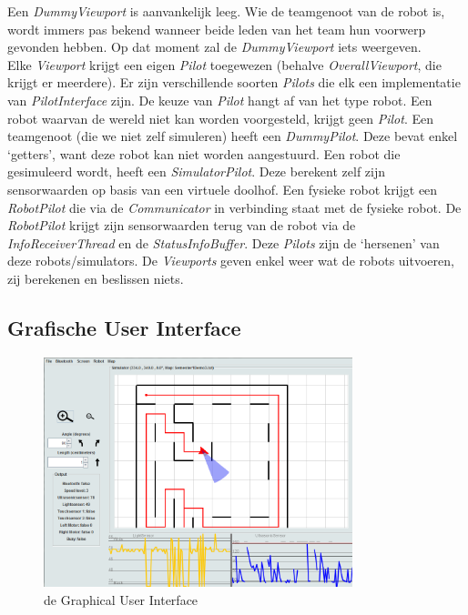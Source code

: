 \documentclass[tt2]{penoverslag}
\begin{document}
Een \textit{DummyViewport} is aanvankelijk leeg. Wie de teamgenoot van de robot is, wordt immers pas bekend wanneer beide leden van het team hun voorwerp gevonden hebben. Op dat moment zal de \textit{DummyViewport} iets weergeven.\\

Elke \textit{Viewport} krijgt een eigen \textit{Pilot} toegewezen (behalve \textit{OverallViewport}, die krijgt er meerdere). Er zijn verschillende soorten \textit{Pilots} die elk een implementatie van \textit{PilotInterface} zijn. De keuze van \textit{Pilot} hangt af van het type robot. Een robot waarvan de wereld niet kan worden voorgesteld, krijgt geen \textit{Pilot}. Een teamgenoot (die we niet zelf simuleren) heeft een \textit{DummyPilot}. Deze bevat enkel `getters', want deze robot kan niet worden aangestuurd. Een robot die gesimuleerd wordt, heeft een \textit{SimulatorPilot}. Deze berekent zelf zijn sensorwaarden op basis van een virtuele doolhof. Een fysieke robot krijgt een \textit{RobotPilot} die via de \textit{Communicator} in verbinding staat met de fysieke robot. De \textit{RobotPilot} krijgt zijn sensorwaarden terug van de robot via de \textit{InfoReceiverThread} en de \textit{StatusInfoBuffer}. Deze \textit{Pilots} zijn de `hersenen' van deze robots/simulators. De \textit{Viewports} geven enkel weer wat de robots uitvoeren, zij berekenen en beslissen niets.

\subsection{Grafische User Interface}
\label{ssec:GUI}

\begin{figure}[h]
\centering
	\includegraphics[width=0.8\textwidth]{GUI}
\caption{de Graphical User Interface}
\label{fig:GUI}
\end{figure}
\end{document}
